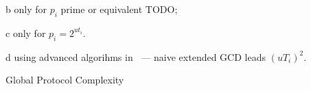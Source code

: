 \documentclass[11pt]{llncs}
\newcommand{\Oapp}{\ensuremath{\tilde{O}}}
\begin{document}
\begin{table}[ht]
\begin{threeparttable}
\begin{tablenotes}
    \item[b] only for $p_i$ prime or equivalent TODO;
    \item[c] only for $p_i = 2^{ut_i}$.
    \item[d] using advanced algorihms in~\cite{pan2004rational,wang2003acceleration} --- naive extended GCD leads $(uT_i)^2$.
  \end{tablenotes}
 \end{threeparttable}
  \caption{Global Protocol Complexity}
  \label{tab:workload}
\end{table}

\end{document}
